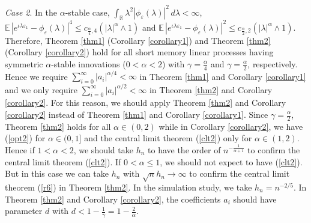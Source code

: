 \documentclass[11pt]{article}
\def\R{{\mathbb R}}
\def\E{{{\mathbb E}\,}}
\begin{document}
 {\it Case 2}.  In the $\alpha$-stable case, $\int_{\R}\lambda^2 |\phi_{\varepsilon}(\lambda)|^2\, d\lambda<\infty$, $\E|e^{\iota \lambda \varepsilon_1}-\phi_{\varepsilon}(\lambda)|^{4}\leq c_{\frac{\alpha}{4},4} \left(|\lambda|^{\alpha}\wedge 1\right)$ and $\E|e^{\iota \lambda \varepsilon_1}-\phi_{\varepsilon}(\lambda)|^{2}\leq c_{\frac{\alpha}{2},2} \left(|\lambda|^{\alpha}\wedge 1\right)$. Therefore, Theorem \ref{thm1} (Corollary \ref{corollary1}) and Theorem \ref{thm2} (Corollary \ref{corollary2}) hold for all short memory linear processes having symmetric $\alpha$-stable innovations ($0<\alpha<2$) with $\gamma=\frac{\alpha}{4}$ and $\gamma=\frac{\alpha}{2}$, respectively. Hence we require $\sum_{i=0}^\infty |a_i|^{\alpha/4}<\infty$ in Theorem \ref{thm1} and Corollary \ref{corollary1} and we only require $\sum_{i=0}^\infty |a_i|^{\alpha/2}<\infty$ in Theorem \ref{thm2} and Corollary \ref{corollary2}.  For this reason, we should apply 
Theorem \ref{thm2} and Corollary \ref{corollary2} instead of Theorem \ref{thm1} and Corollary \ref{corollary1}. Since $\gamma=\frac{\alpha}{2}$, Theorem \ref{thm2} holds  for all $\alpha\in (0,2)$ while in Corollary \ref{corollary2}, we have (\ref{opt2}) for $\alpha\in (0,1]$ and the central limit theorem (\ref{clt2}) only for $\alpha\in (1,2)$.
%
Hence if $1<\alpha<2$, we should take $h_n$ to have the order of $n^{-\frac{1}{\alpha+1}}$ to confirm the central limit theorem (\ref{clt2}).  If  $0<\alpha\le 1$, we should not expect to have (\ref{clt2}). But in this case we can take $h_n$ with $\sqrt{n}h_n\rightarrow \infty$ to confirm the central limit theorem (\ref{r6}) in Theorem \ref{thm2}. In the simulation study, we take $h_n=n^{-2/5}$. In Theorem \ref{thm2} and Corollary \ref{corollary2}, the coefficients $a_i$ should have parameter $d$ with $d<1-\frac{1}{\gamma}=1-\frac{2}{\alpha}$.  
\end{document}
